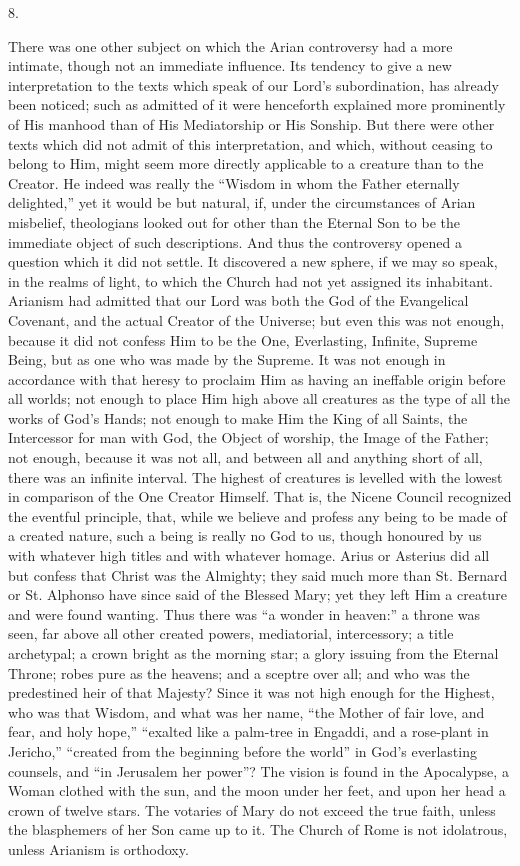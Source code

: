 8.

There was one other subject on which the Arian
controversy had a more intimate, though not an immediate
influence. Its tendency to give a new interpretation to
the texts which speak of our Lord's subordination, has
already been noticed; such as admitted of it were
henceforth explained more prominently of His manhood than
of His Mediatorship or His Sonship. But there were other
texts which did not admit of this interpretation, and
which, without ceasing to belong to Him, might seem more
directly applicable to a creature than to the Creator. He
indeed was really the ``Wisdom in whom the Father
eternally delighted,'' yet it would be but natural,
if, under the circumstances of Arian misbelief,
theologians looked out for other than the Eternal Son to
be the immediate object of such descriptions. And thus
the controversy opened a question which it did not
settle. It discovered a new sphere, if we may so speak,
in the realms of light, to which the Church had not yet
assigned its inhabitant. Arianism had admitted that our
Lord was both the God of the Evangelical Covenant, and
the actual Creator of the Universe; but even this was not
enough, because it did not confess Him to be the One,
Everlasting, Infinite, Supreme Being, but as one who was
made by the Supreme. It was not enough in accordance with
that heresy to proclaim Him as having an ineffable origin
before all worlds; not enough to place Him high above all
creatures as the type of all the works of God's Hands;
not enough to make Him the King of all Saints, the
Intercessor for man with God, the Object of worship, the
Image of the Father; not enough, because it was not all,
and between all and anything short of all, there was an
infinite interval. The highest of creatures is levelled
with the lowest in comparison of the One Creator Himself.
That is, the Nicene Council recognized the eventful
principle, that, while we believe and profess any being
to be made of a created nature, such a being is really no
God to us, though honoured by us with whatever high
titles and with whatever homage. Arius or Asterius did
all but confess that Christ was the Almighty; they said
much more than St. Bernard or St. Alphonso have since
said of the Blessed Mary; yet they left Him a creature
and were found wanting. Thus there was ``a wonder in
heaven:'' a throne was seen, far above all other
created powers, mediatorial, intercessory; a title
archetypal; a crown bright as the morning star; a glory
issuing from the Eternal Throne; robes pure as the heavens; and a sceptre over all; and who was the
predestined heir of that Majesty? Since it was not high
enough for the Highest, who was that Wisdom, and what was
her name, ``the Mother of fair love, and fear, and
holy hope,'' ``exalted like a palm-tree in
Engaddi, and a rose-plant in Jericho,'' ``created
from the beginning before the world'' in God's
everlasting counsels, and ``in Jerusalem her
power''? The vision is found in the Apocalypse, a
Woman clothed with the sun, and the moon under her feet,
and upon her head a crown of twelve stars. The votaries of
Mary do not exceed the true faith, unless the blasphemers
of her Son came up to it. The Church of Rome is not
idolatrous, unless Arianism is orthodoxy.

